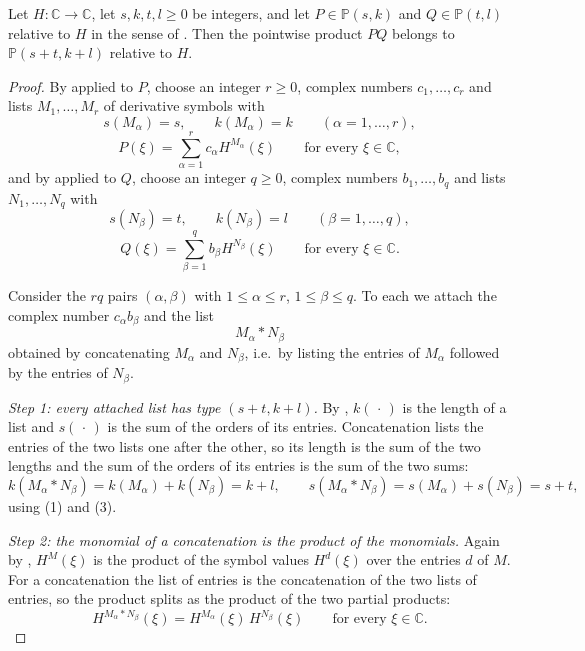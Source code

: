 \begin{lemma}
Let $H\colon\mathbb{C}\to\mathbb{C}$, let $s,k,t,l\ge0$ be integers, and let
$P\in\mathbb{P}(s,k)$ and $Q\in\mathbb{P}(t,l)$ relative to $H$ in the sense
of .  Then the pointwise product $PQ$ belongs to
$\mathbb{P}(s+t,k+l)$ relative to $H$.
\end{lemma}
\begin{proof}
By  applied to $P$, choose an integer $r\ge0$, complex numbers
$c_1,\dots,c_r$ and lists $M_1,\dots,M_r$ of derivative symbols with
\begin{equation}\tag{1}
  s(M_\alpha)=s,\qquad k(M_\alpha)=k\qquad(\alpha=1,\dots,r),
\end{equation}
\begin{equation}\tag{2}
  P(\xi)=\sum_{\alpha=1}^{r}c_\alpha H^{M_\alpha}(\xi)\qquad\text{for every }\xi\in\mathbb{C},
\end{equation}
and by  applied to $Q$, choose an integer $q\ge0$, complex
numbers $b_1,\dots,b_q$ and lists $N_1,\dots,N_q$ with
\begin{equation}\tag{3}
  s(N_\beta)=t,\qquad k(N_\beta)=l\qquad(\beta=1,\dots,q),
\end{equation}
\begin{equation}\tag{4}
  Q(\xi)=\sum_{\beta=1}^{q}b_\beta H^{N_\beta}(\xi)\qquad\text{for every }\xi\in\mathbb{C}.
\end{equation}

Consider the $rq$ pairs $(\alpha,\beta)$ with $1\le\alpha\le r$,
$1\le\beta\le q$.  To each we attach the complex number $c_\alpha b_\beta$ and
the list
\[
  M_\alpha * N_\beta
\]
obtained by concatenating $M_\alpha$ and $N_\beta$, i.e.\ by listing the
entries of $M_\alpha$ followed by the entries of $N_\beta$.

\emph{Step 1: every attached list has type $(s+t,k+l)$.}  By
, $k(\,\cdot\,)$ is the length of a list and
$s(\,\cdot\,)$ is the sum of the orders of its entries.  Concatenation lists
the entries of the two lists one after the other, so its length is the sum of
the two lengths and the sum of the orders of its entries is the sum of the two
sums:
\[
  k(M_\alpha * N_\beta)=k(M_\alpha)+k(N_\beta)=k+l,
  \qquad
  s(M_\alpha * N_\beta)=s(M_\alpha)+s(N_\beta)=s+t,
\]
using (1) and (3).

\emph{Step 2: the monomial of a concatenation is the product of the
monomials.}  Again by , $H^{M}(\xi)$ is the product of
the symbol values $H^{d}(\xi)$ over the entries $d$ of $M$.  For a
concatenation the list of entries is the concatenation of the two lists of
entries, so the product splits as the product of the two partial products:
\begin{equation}\tag{5}
  H^{M_\alpha * N_\beta}(\xi)=H^{M_\alpha}(\xi)\,H^{N_\beta}(\xi)
  \qquad\text{for every }\xi\in\mathbb{C}.
\end{equation}


\end{proof}
